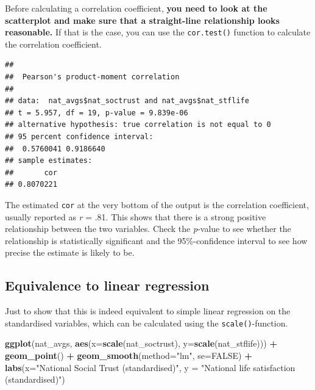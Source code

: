 \documentclass[
]{book}
\newenvironment{Shaded}{\begin{snugshade}}{\end{snugshade}}
\newcommand{\CommentTok}[1]{\textcolor[rgb]{0.56,0.35,0.01}{\textit{#1}}}
\newcommand{\DataTypeTok}[1]{\textcolor[rgb]{0.13,0.29,0.53}{#1}}
\newcommand{\KeywordTok}[1]{\textcolor[rgb]{0.13,0.29,0.53}{\textbf{#1}}}
\newcommand{\NormalTok}[1]{#1}
\newcommand{\OperatorTok}[1]{\textcolor[rgb]{0.81,0.36,0.00}{\textbf{#1}}}
\newcommand{\OtherTok}[1]{\textcolor[rgb]{0.56,0.35,0.01}{#1}}
\newcommand{\StringTok}[1]{\textcolor[rgb]{0.31,0.60,0.02}{#1}}
\begin{document}
Before calculating a correlation coefficient, \textbf{you need to look at the
scatterplot and make sure that a straight-line relationship looks
reasonable.} If that is the case, you can use the \texttt{cor.test()} function
to calculate the correlation coefficient.

\begin{Shaded}
\end{Shaded}

\begin{verbatim}
## 
## 	Pearson's product-moment correlation
## 
## data:  nat_avgs$nat_soctrust and nat_avgs$nat_stflife
## t = 5.957, df = 19, p-value = 9.839e-06
## alternative hypothesis: true correlation is not equal to 0
## 95 percent confidence interval:
##  0.5760041 0.9186640
## sample estimates:
##       cor 
## 0.8070221
\end{verbatim}

The estimated \texttt{cor} at the very bottom of the output is the correlation
coefficient, usually reported as \emph{r} = .81. This shows that there is a
strong positive relationship between the two variables. Check the
\emph{p}-value to see whether the relationship is statistically significant
and the 95\%-confidence interval to see how precise the estimate is
likely to be.

\hypertarget{equivalence-to-linear-regression}{%
\subsection{Equivalence to linear regression}\label{equivalence-to-linear-regression}}

Just to show that this is indeed equivalent to simple linear regression
on the standardised variables, which can be calculated using the
\texttt{scale()}-function.

\begin{Shaded}
\begin{Highlighting}[]
\KeywordTok{ggplot}\NormalTok{(nat_avgs, }\KeywordTok{aes}\NormalTok{(}\DataTypeTok{x=}\KeywordTok{scale}\NormalTok{(nat_soctrust), }\DataTypeTok{y=}\KeywordTok{scale}\NormalTok{(nat_stflife))) }\OperatorTok{+}\StringTok{ }
\StringTok{  }\KeywordTok{geom_point}\NormalTok{() }\OperatorTok{+}\StringTok{ }\KeywordTok{geom_smooth}\NormalTok{(}\DataTypeTok{method=}\StringTok{"lm"}\NormalTok{, }\DataTypeTok{se=}\OtherTok{FALSE}\NormalTok{) }\OperatorTok{+}\StringTok{ }\KeywordTok{labs}\NormalTok{(}\DataTypeTok{x=}\StringTok{"National Social Trust (standardised)"}\NormalTok{, }\DataTypeTok{y =} \StringTok{"National life satisfaction (standardised)"}\NormalTok{)}
\end{Highlighting}
\end{Shaded}
\end{document}
